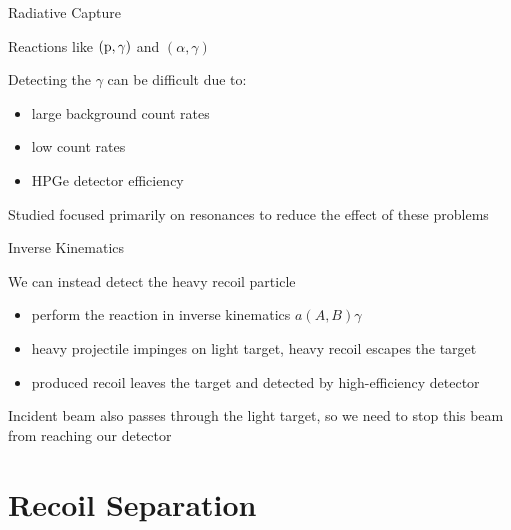 \documentclass[10pt]{beamer}
\newcommand{\react}[4]{$#1(#2,#3)#4$}
\begin{document}

\begin{frame}[fragile]{Radiative Capture}

    Reactions like $({\rm p}, \gamma)$ and $(\alpha,\gamma)$

    Detecting the $\gamma$ can be difficult due to:
    \begin{itemize}
        \item large background count rates
        \item low count rates
        \item HPGe detector efficiency
    \end{itemize}

    Studied focused primarily on resonances to reduce the effect of
    these problems

\end{frame}

\begin{frame}[fragile]{Inverse Kinematics}

    We can instead detect the heavy recoil particle
    \begin{itemize}
        \item perform the reaction in inverse kinematics
            \react{a}{A}{B}{\gamma}
        \item heavy projectile impinges on light target, heavy recoil
            escapes the target
        \item produced recoil leaves the target and detected by
            high-efficiency detector
    \end{itemize}

    Incident beam also passes through the light target, so we need to
    stop this beam from reaching our detector

\end{frame}

\section{Recoil Separation}
\end{document}

